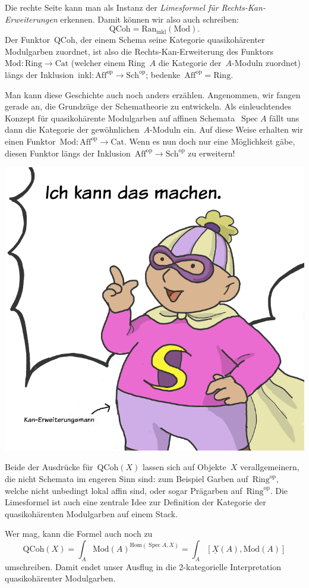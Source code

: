 \documentclass[a4paper,ngerman,12pt]{scrartcl}
\theoremstyle{definition}
\theoremstyle{plain}
\theoremstyle{remark}
\newcommand{\op}{\mathrm{op}}
\newcommand{\Hom}{\mathrm{Hom}}
\newcommand{\ul}[1]{\underline{#1}}
\DeclareMathOperator{\Spec}{Spec}
\begin{document}
Die rechte Seite kann man als Instanz der \emph{Limesformel für
Rechts-Kan-Erweiterungen} erkennen. Damit können wir also auch schreiben:
\[ \mathrm{QCoh} = \mathrm{Ran}_\mathrm{inkl}(\mathrm{Mod}). \]
Der Funktor~$\mathrm{QCoh}$, der einem Schema seine Kategorie quasikohärenter
Modulgarben zuordnet, ist also die Rechts-Kan-Erweiterung des
Funktors~$\mathrm{Mod} : \mathrm{Ring} \to \mathrm{Cat}$ (welcher einem
Ring~$A$ die Kategorie der~$A$-Moduln zuordnet) längs der
Inklusion~$\mathrm{inkl} : \mathrm{Aff}^\op \to \mathrm{Sch}^\op$;
bedenke~$\mathrm{Aff}^\op = \mathrm{Ring}$.

Man kann diese Geschichte auch noch anders erzählen. Angenommen, wir fangen
gerade an, die Grundzüge der Schematheorie zu entwickeln. Als einleuchtendes
Konzept für quasikohärente Modulgarben auf affinen Schemata~$\Spec A$ fällt uns
dann die Kategorie der gewöhnlichen~$A$-Moduln ein. Auf diese Weise erhalten
wir einen Funktor~$\mathrm{Mod} : \mathrm{Aff}^\op \to \mathrm{Cat}$. Wenn es
nun doch nur eine Möglichkeit gäbe, diesen Funktor längs der
Inklusion~$\mathrm{Aff}^\op \to \mathrm{Sch}^\op$ zu erweitern!

\begin{center}
\includegraphics[scale=0.28]{kan-erweiterungsmann}
\end{center}

Beide der Ausdrücke für~$\mathrm{QCoh}(X)$ lassen sich auf Objekte~$X$
verallgemeinern, die nicht Schemata im engeren Sinn sind: zum Beispiel Garben
auf~$\mathrm{Ring}^\op$, welche nicht unbedingt lokal affin sind, oder sogar
Prägarben auf~$\mathrm{Ring}^\op$. Die Limesformel ist auch eine zentrale Idee
zur Definition der Kategorie der quasikohärenten Modulgarben auf einem Stack.

Wer mag, kann die Formel auch noch zu
\[ \mathrm{QCoh}(X) = \int_A \mathrm{Mod}(A)^{\Hom(\Spec A, X)} =
  \int_A [\ul{X}(A), \mathrm{Mod}(A)] \]
umschreiben. Damit endet unser Ausflug in die 2-kategorielle Interpretation
quasikohärenter Modulgarben.
\end{document}
